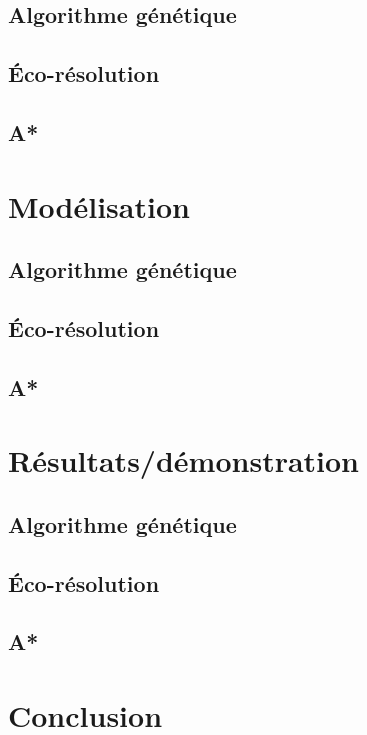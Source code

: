 \documentclass{beamer}
\begin{document}
        \subsection{Algorithme génétique}
            
        \subsection{Éco-résolution}
            
        \subsection{A*}
            
    \section{Modélisation}
        \subsection{Algorithme génétique}
            
        \subsection{Éco-résolution}
            
        \subsection{A*}
            
    \section{Résultats/démonstration}
        \subsection{Algorithme génétique}
            
        \subsection{Éco-résolution}
            
        \subsection{A*}
            
    \section{Conclusion}
        \subsection{}
            
\end{document}

